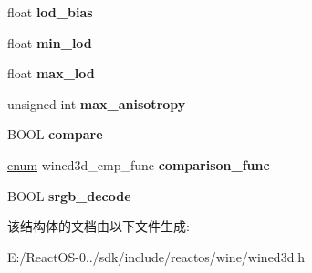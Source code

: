 \begin{DoxyCompactItemize}
\item 
\mbox{\label{structwined3d__sampler__desc_a4d0a57b52850e35e6d368e42b242d8f6}} 
float {\bfseries lod\+\_\+bias}
\item 
\mbox{\label{structwined3d__sampler__desc_a0e43c8d5a639e02c52989cd8cf4f2463}} 
float {\bfseries min\+\_\+lod}
\item 
\mbox{\label{structwined3d__sampler__desc_a53872e64fabfce01897cc022e91a3d5a}} 
float {\bfseries max\+\_\+lod}
\item 
\mbox{\label{structwined3d__sampler__desc_a3f2aaedcbd9b52d6b95acf3d9989ca62}} 
unsigned int {\bfseries max\+\_\+anisotropy}
\item 
\mbox{\label{structwined3d__sampler__desc_aff01f23b0aa24f1e64aae6ab1537f1bf}} 
B\+O\+OL {\bfseries compare}
\item 
\mbox{\label{structwined3d__sampler__desc_a29c70bbe816b27d4cbc3400dfd3c97e7}} 
\hyperlink{interfaceenum}{enum} wined3d\+\_\+cmp\+\_\+func {\bfseries comparison\+\_\+func}
\item 
\mbox{\label{structwined3d__sampler__desc_abbb8b1e852f9c1364a548cc14d4c290b}} 
B\+O\+OL {\bfseries srgb\+\_\+decode}
\end{DoxyCompactItemize}


该结构体的文档由以下文件生成\+:\begin{DoxyCompactItemize}
\item 
E\+:/\+React\+O\+S-\/0../sdk/include/reactos/wine/wined3d.\+h\end{DoxyCompactItemize}
